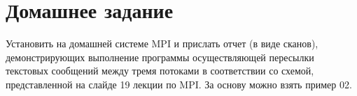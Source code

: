 \section{Домашнее задание}

Установить на домашней системе MPI и прислать отчет (в виде сканов), демонстрирующих выполнение программы осуществляющей пересылки текстовых сообщений между тремя потоками в соответствии со схемой, представленной на слайде 19 лекции по MPI. За основу можно взять пример 02.

